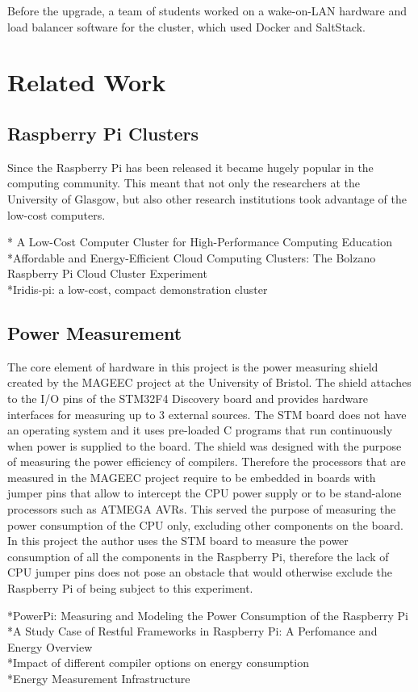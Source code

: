 \documentclass{l4proj}
\begin{document}
\noindent
Before the upgrade, a team of students worked on a wake-on-LAN hardware and load balancer software for the cluster, which used Docker and SaltStack.

\section{Related Work}
\subsection{Raspberry Pi Clusters}
Since the Raspberry Pi has been released it became hugely popular in the computing community. This meant that not only the researchers at the University of Glasgow, but also other research institutions took advantage of the low-cost computers. 

* A Low-Cost Computer Cluster for High-Performance Computing Education\\
*Affordable and Energy-Efficient Cloud Computing Clusters: The Bolzano Raspberry Pi Cloud Cluster Experiment\\
*Iridis-pi: a low-cost, compact demonstration cluster\\
\subsection{Power Measurement}
The core element of hardware in this project is the power measuring shield created by the MAGEEC project at the University of Bristol. The shield attaches to the I/O pins of the STM32F4 Discovery board and provides hardware interfaces for measuring up to 3 external sources. The STM board does not have an operating system and it uses pre-loaded C programs that run continuously when power is supplied to the board. The shield was designed with the purpose of measuring the power efficiency of compilers. Therefore the processors that are measured in the MAGEEC project require to be embedded in boards with jumper pins that allow to intercept the CPU power supply or to be stand-alone processors such as ATMEGA AVRs. This served the purpose of measuring the power consumption of the CPU only, excluding other components on the board. In this project the author uses the STM board to measure the power consumption of all the components in the Raspberry Pi, therefore the lack of CPU jumper pins does not pose an obstacle that would otherwise exclude the Raspberry Pi of being subject to this experiment.

*PowerPi: Measuring and Modeling the Power Consumption of the Raspberry Pi\\
*A Study Case of Restful Frameworks in Raspberry Pi: A Perfomance and Energy Overview\\
*Impact of different compiler options on energy consumption\\
*Energy Measurement Infrastructure\\
\end{document}
